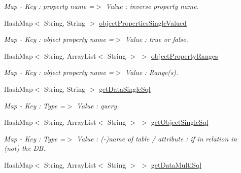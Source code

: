\begin{DoxyCompactItemize}
\begin{DoxyCompactList}\small\item\em Map -\/ Key : property name =$>$ Value : inverse property name. \end{DoxyCompactList}\item 
\hypertarget{class_classes_c_p_p_1_1_dao_generator_a3173466faa066f9caea2e5dcaba3b330}{
HashMap$<$ String, String $>$ \hyperlink{class_classes_c_p_p_1_1_dao_generator_a3173466faa066f9caea2e5dcaba3b330}{objectPropertiesSingleValued}}
\label{class_classes_c_p_p_1_1_dao_generator_a3173466faa066f9caea2e5dcaba3b330}

\begin{DoxyCompactList}\small\item\em Map -\/ Key : object property name =$>$ Value : true or false. \end{DoxyCompactList}\item 
\hypertarget{class_classes_c_p_p_1_1_dao_generator_af8c39fd61441c9eaa88b350a7890c347}{
HashMap$<$ String, ArrayList$<$ String $>$ $>$ \hyperlink{class_classes_c_p_p_1_1_dao_generator_af8c39fd61441c9eaa88b350a7890c347}{objectPropertyRanges}}
\label{class_classes_c_p_p_1_1_dao_generator_af8c39fd61441c9eaa88b350a7890c347}

\begin{DoxyCompactList}\small\item\em Map -\/ Key : object property name =$>$ Value : Range(s). \end{DoxyCompactList}\item 
\hypertarget{class_classes_c_p_p_1_1_dao_generator_a6be3dbb95bc9ecb7cc20e19ec207f002}{
HashMap$<$ String, String $>$ \hyperlink{class_classes_c_p_p_1_1_dao_generator_a6be3dbb95bc9ecb7cc20e19ec207f002}{getDataSingleSql}}
\label{class_classes_c_p_p_1_1_dao_generator_a6be3dbb95bc9ecb7cc20e19ec207f002}

\begin{DoxyCompactList}\small\item\em Map -\/ Key : Type =$>$ Value : query. \end{DoxyCompactList}\item 
\hypertarget{class_classes_c_p_p_1_1_dao_generator_a76d97a7ffeeaa76262df17e7f24e4fab}{
HashMap$<$ String, ArrayList$<$ String $>$ $>$ \hyperlink{class_classes_c_p_p_1_1_dao_generator_a76d97a7ffeeaa76262df17e7f24e4fab}{getObjectSingleSql}}
\label{class_classes_c_p_p_1_1_dao_generator_a76d97a7ffeeaa76262df17e7f24e4fab}

\begin{DoxyCompactList}\small\item\em Map -\/ Key : Type =$>$ Value : (-\/)name of table / attribute : if in relation in (not) the DB. \end{DoxyCompactList}\item 
\hypertarget{class_classes_c_p_p_1_1_dao_generator_ada1138c2e61e4981aafd2876a852887a}{
HashMap$<$ String, ArrayList$<$ String $>$ $>$ \hyperlink{class_classes_c_p_p_1_1_dao_generator_ada1138c2e61e4981aafd2876a852887a}{getDataMultiSql}}
\label{class_classes_c_p_p_1_1_dao_generator_ada1138c2e61e4981aafd2876a852887a}


\end{DoxyCompactItemize}
